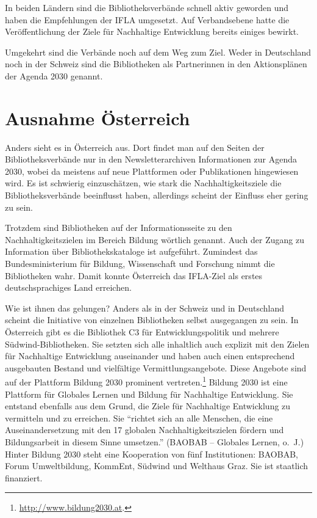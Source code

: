 \documentclass[a4paper,
fontsize=11pt,
oneside,
numbers=noperiodatend,
parskip=half-,
bibliography=totoc,
final
]{scrartcl}
\begin{document}
In beiden Ländern sind die Bibliotheksverbände schnell aktiv geworden
und haben die Empfehlungen der IFLA umgesetzt. Auf Verbandsebene hatte
die Veröffentlichung der Ziele für Nachhaltige Entwicklung bereits
einiges bewirkt.

Umgekehrt sind die Verbände noch auf dem Weg zum Ziel. Weder in
Deutschland noch in der Schweiz sind die Bibliotheken als Partnerinnen
in den Aktionsplänen der Agenda 2030 genannt.

\hypertarget{ausnahme-uxf6sterreich}{%
\section{Ausnahme Österreich}\label{ausnahme-uxf6sterreich}}

Anders sieht es in Österreich aus. Dort findet man auf den Seiten der
Bibliotheksverbände nur in den Newsletterarchiven Informationen zur
Agenda 2030, wobei da meistens auf neue Plattformen oder Publikationen
hingewiesen wird. Es ist schwierig einzuschätzen, wie stark die
Nachhaltigkeitsziele die Bibliotheksverbände beeinflusst haben,
allerdings scheint der Einfluss eher gering zu sein.

Trotzdem sind Bibliotheken auf der Informationsseite zu den
Nachhaltigkeitszielen im Bereich Bildung wörtlich genannt. Auch der
Zugang zu Information über Bibliothekskataloge ist aufgeführt. Zumindest
das Bundesministerium für Bildung, Wissenschaft und Forschung nimmt die
Bibliotheken wahr. Damit konnte Österreich das IFLA-Ziel als erstes
deutschsprachiges Land erreichen.

Wie ist ihnen das gelungen? Anders als in der Schweiz und in Deutschland
scheint die Initiative von einzelnen Bibliotheken selbst ausgegangen zu
sein. In Österreich gibt es die Bibliothek C3 für Entwicklungspolitik
und mehrere Südwind-Bibliotheken. Sie setzten sich alle inhaltlich auch
explizit mit den Zielen für Nachhaltige Entwicklung auseinander und
haben auch einen entsprechend ausgebauten Bestand und vielfältige
Vermittlungsangebote. Diese Angebote sind auf der Plattform Bildung 2030
prominent vertreten.\footnote{\url{http://www.bildung2030.at}.} Bildung
2030 ist eine Plattform für Globales Lernen und Bildung für Nachhaltige
Entwicklung. Sie entstand ebenfalls aus dem Grund, die Ziele für
Nachhaltige Entwicklung zu vermitteln und zu erreichen. Sie
\enquote{richtet sich an alle Menschen, die eine Auseinandersetzung mit
den 17 globalen Nachhaltigkeitszielen fördern und Bildungsarbeit in
diesem Sinne umsetzen.} (BAOBAB -- Globales Lernen, o.~J.) Hinter
Bildung 2030 steht eine Kooperation von fünf Institutionen: BAOBAB,
Forum Umweltbildung, KommEnt, Südwind und Welthaus Graz. Sie ist
staatlich finanziert.
\end{document}
